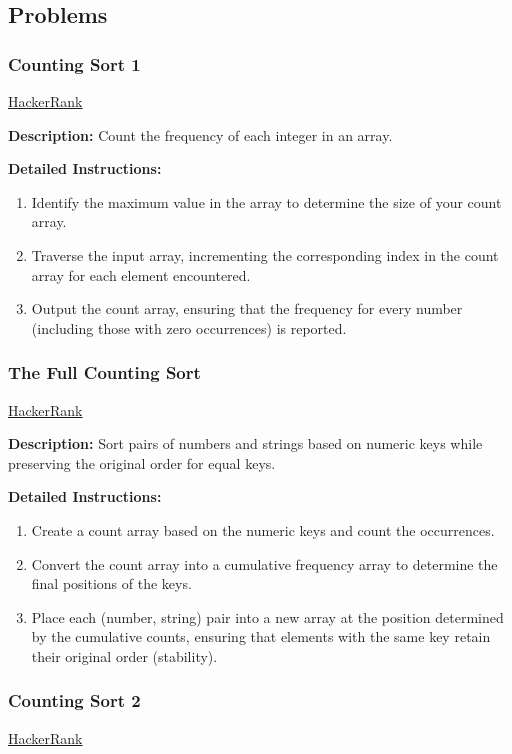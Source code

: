 \subsection{Problems}
\subsubsection{Counting Sort 1}
\href{https://www.hackerrank.com/challenges/one-week-preparation-kit-countingsort1/problem}{HackerRank}

\textbf{Description:} Count the frequency of each integer in an array.

\textbf{Detailed Instructions:}
\begin{enumerate}
    \item Identify the maximum value in the array to determine the size of your count array.
    \item Traverse the input array, incrementing the corresponding index in the count array for each element encountered.
    \item Output the count array, ensuring that the frequency for every number (including those with zero occurrences) is reported.
\end{enumerate}

\subsubsection{The Full Counting Sort}
\href{https://www.hackerrank.com/challenges/countingsort4/problem}{HackerRank}

\textbf{Description:} Sort pairs of numbers and strings based on numeric keys while preserving the original order for equal keys.

\textbf{Detailed Instructions:}
\begin{enumerate}
    \item Create a count array based on the numeric keys and count the occurrences.
    \item Convert the count array into a cumulative frequency array to determine the final positions of the keys.
    \item Place each (number, string) pair into a new array at the position determined by the cumulative counts, ensuring that elements with the same key retain their original order (stability).
\end{enumerate}

\subsubsection{Counting Sort 2}
\href{https://www.hackerrank.com/challenges/countingsort2/problem}{HackerRank}

